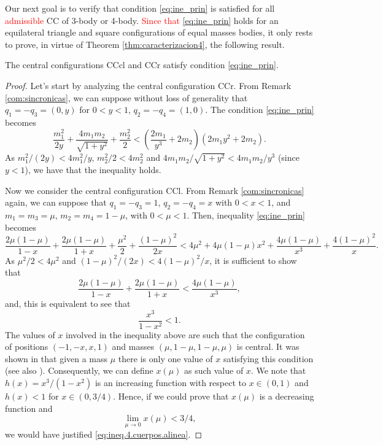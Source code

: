 \documentclass[smallcondensed]{svjour3}
\begin{document}
Our next goal is to verify that condition \eqref{eq:ine_prin} is satisfied for all \textcolor{red}{admissible}   CC of 3-body or 4-body. \textcolor{red}{Since  that} \eqref{eq:ine_prin} holds for an equilateral triangle and square configurations of equal masses bodies, it only rests to prove, in virtue of Theorem \ref{thm:caracterizacion4}, the following result.




\begin{theorem}\label{thm:CC.3.4.satis.cond.adm}
The central configurations CCcl and CCr satisfy condition \eqref{eq:ine_prin}.
\end{theorem}



\begin{proof}

Let's start by analyzing the central configuration CCr. From  Remark \ref{com:sincronicas}, we can suppose without loss of generality that $ q_1 = -q_3 = (0, y) $ for $ 0<y<1 $, $ q_2 = -q_4 = (1,0) $. The condition \eqref{eq:ine_prin} becomes
\[\frac{m_1^2}{2y}+\frac{4m_1m_2}{\sqrt{1+y^2}}+\frac{m_2^2}{2}<\left(\frac{2m_1}{y^3}+2m_2\right) \left(2m_1y^2+2m_2\right).\]
As $m_1^2/(2y)<4m_1^2/y$, $m_2^2/2<4m_2^2$ and $4m_1m_2/\sqrt{1+y^2}<4m_1m_2/y^3$ (since $y<1$), we have that the inequality holds.

 Now we consider the central configuration CCl. From Remark \ref{com:sincronicas} again, we can suppose  that $q_1=-q_3=1$, $q_2=-q_4=x$ with $0<x<1$, and $m_1=m_3=\mu$, $m_2=m_4=1-\mu$, with $0<\mu<1$.  Then, inequality \eqref{eq:ine_prin} becomes
\[\frac{2\mu(1-\mu)}{1-x} +\frac{2\mu(1-\mu)}{1+x}+\frac{\mu^2}{2}+\frac{(1-\mu)^2}{2x}<4\mu^2+4\mu(1-\mu)x^2+\frac{4\mu(1-\mu)}{x^3}+\frac{4(1-\mu)^2}{x}.\]
As $ \mu ^ 2/2 <4 \mu^2$ and $ (1-\mu)^2/(2x)< 4(1-\mu)^2/x $, it is sufficient to show that
\[\frac{2\mu(1-\mu)}{1-x} +\frac{2\mu(1-\mu)}{1+x}<\frac{4\mu(1-\mu)}{x^3},\]
and, this is equivalent to see that
\begin{equation}\label{eq:ineq.4.cuerpos.alinea}
\frac{x^3}{1-x^2}<1.
\end{equation}
The values of $x$ involved in the  inequality above are such that the configuration of positions $(-1,-x,x,1)$ and masses $(\mu,1-\mu,1-\mu,\mu)$ is central. It was shown in \cite{moulton1910straight} that given a mass $\mu$ there is only one value of $x$ satisfying this condition (see also \cite{shoaib2011collinear}). Consequently, we can define $x(\mu)$ as such value of $x$.  We note that $h(x)=x^3/(1-x^2)$ is an increasing function with respect to $x\in (0,1)$ and $h(x)< 1$ for $x\in (0,3/4)$. Hence, if we could prove that $x(\mu)$ is a decreasing function and
\begin{equation}\label{eq:ineq.4.cuerpos.lim0}
\lim\limits_{\mu\to 0}x(\mu)<3/4,
\end{equation}
we would have justified \eqref {eq:ineq.4.cuerpos.alinea}.


\end{proof}
\end{document}

